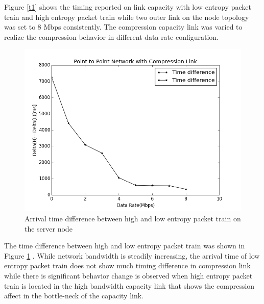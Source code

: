 \documentclass[sigconf]{acmart}
\begin{document}
Figure \ref{t1} shows the timing reported on link capacity with low entropy packet train and high entropy packet train while two outer link on the node topology was set to 8 Mbps consistently. The compression capacity link was varied to realize the compression behavior in different data rate configuration. 

 \begin{figure}[h]
  \centering
  \includegraphics[width=\linewidth]{timing2}
  \caption{Arrival time difference between high and low entropy packet train on the server node }
  \label{t2}
\end{figure} 

The time difference between high and low entropy packet train was shown in Figure \ref{t2} . While network bandwidth is steadily increasing, the arrival time of low entropy packet train does not show much timing difference in compression link while there is significant behavior change is observed when high entropy packet train is located in the high bandwidth capacity link that shows the compression affect in the bottle-neck of the capacity link. 








\end{document}
